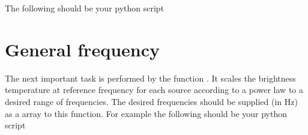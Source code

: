 \documentclass[letterpaper,10pt,english]{sphinxmanual}
\begin{document}
\sphinxAtStartPar
The following should be your python script

\begin{sphinxVerbatim}[commandchars=\\\{\}]
   

  

\end{sphinxVerbatim}


\section{General frequency}
\label{\detokenize{detexp:general-frequency}}\label{\detokenize{detexp:gen-freq}}
\sphinxAtStartPar
The next important task is performed by the function . It scales the brightness temperature at reference frequency for each source according to a power law to a desired range of frequencies. The desired frequencies should be supplied (in Hz) as a  array to this function. For example the following should be your python script

\begin{sphinxVerbatim}[commandchars=\\\{\}]
   

  


  
\end{sphinxVerbatim}
\end{document}
